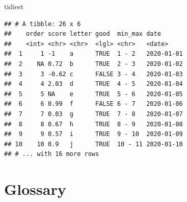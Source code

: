 \documentclass[
  oneside]{book}
\newenvironment{Shaded}{\begin{snugshade}}{\end{snugshade}}
\newcommand{\NormalTok}[1]{#1}
\begin{document}
\begin{Shaded}
\begin{Highlighting}[]
\NormalTok{tidiest}
\end{Highlighting}
\end{Shaded}

\begin{verbatim}
## # A tibble: 26 x 6
##    order score letter good  min_max date      
##    <int> <chr> <chr>  <lgl> <chr>   <date>    
##  1     1 -1    a      TRUE  1 - 2   2020-01-01
##  2    NA 0.72  b      TRUE  2 - 3   2020-01-02
##  3     3 -0.62 c      FALSE 3 - 4   2020-01-03
##  4     4 2.03  d      TRUE  4 - 5   2020-01-04
##  5     5 NA    e      TRUE  5 - 6   2020-01-05
##  6     6 0.99  f      FALSE 6 - 7   2020-01-06
##  7     7 0.03  g      TRUE  7 - 8   2020-01-07
##  8     8 0.67  h      TRUE  8 - 9   2020-01-08
##  9     9 0.57  i      TRUE  9 - 10  2020-01-09
## 10    10 0.9   j      TRUE  10 - 11 2020-01-10
## # ... with 16 more rows
\end{verbatim}

\hypertarget{glossary-data}{%
\section{Glossary}\label{glossary-data}}
\end{document}
